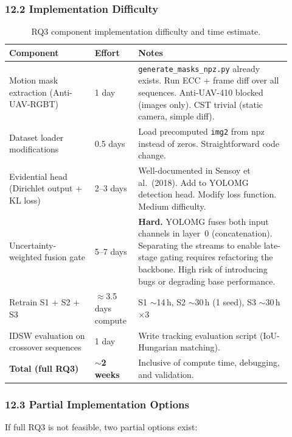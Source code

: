 \subsubsection*{12.2 Implementation Difficulty}

\begin{table}[h]
\centering
\caption{RQ3 component implementation difficulty and time estimate.}
\label{tab:rq3_effort}
\small
\begin{tabular}{p{0.28\linewidth}p{0.14\linewidth}p{0.50\linewidth}}
\hline
\textbf{Component} & \textbf{Effort} & \textbf{Notes} \\
\hline
Motion mask extraction (Anti-UAV-RGBT)
& 1 day
& \texttt{generate\_masks\_npz.py} already exists. Run ECC + frame
  diff over all sequences. Anti-UAV-410 blocked (images only).
  CST trivial (static camera, simple diff). \\[4pt]
Dataset loader modifications
& 0.5 days
& Load precomputed \texttt{img2} from npz instead of zeros.
  Straightforward code change. \\[4pt]
Evidential head (Dirichlet output + KL loss)
& 2--3 days
& Well-documented in Sensoy et al.\ (2018). Add to YOLOMG detection
  head. Modify loss function. Medium difficulty. \\[4pt]
Uncertainty-weighted fusion gate
& 5--7 days
& \textbf{Hard.} YOLOMG fuses both input channels in layer~0
  (concatenation). Separating the streams to enable late-stage
  gating requires refactoring the backbone. High risk of introducing
  bugs or degrading base performance. \\[4pt]
Retrain S1 + S2 + S3
& $\approx$3.5 days compute
& S1 $\sim$14\,h, S2 $\sim$30\,h (1 seed), S3 $\sim$30\,h $\times$3 \\[4pt]
IDSW evaluation on crossover sequences
& 1 day
& Write tracking evaluation script (IoU-Hungarian matching). \\
\hline
\textbf{Total (full RQ3)} & \textbf{$\sim$2 weeks} & Inclusive of compute time, debugging, and validation. \\
\hline
\end{tabular}
\end{table}

\subsubsection*{12.3 Partial Implementation Options}

If full RQ3 is not feasible, two partial options exist:

